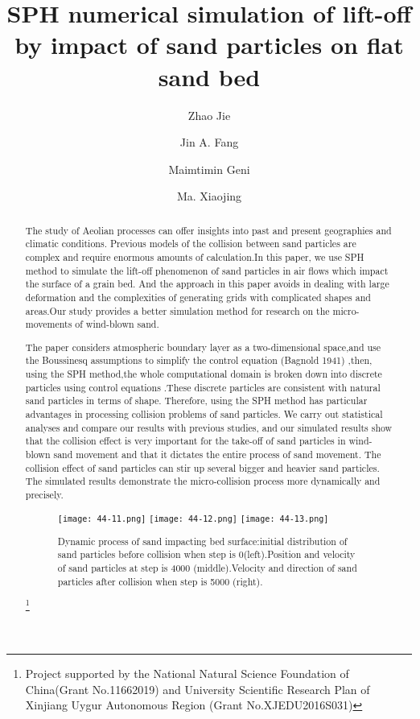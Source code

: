 \documentclass[10pt]{article}
\title{SPH numerical simulation of lift-off by impact of sand particles on flat sand bed}
\date{}
\author[$\relax$]{Zhao Jie}
\author[$\relax$]{Jin A. Fang}
\author[$\relax$]{Maimtimin Geni}
\author[$\relax$]{Ma. Xiaojing}
\affil[$\relax$]{College of Mechanical Engineering, Xinjiang University, Urumqi Xinjiang 830047 China}
\newcommand\blfootnote[1]{%
  \begingroup
  \renewcommand\thefootnote{}\footnote{#1}%
  \addtocounter{footnote}{-1}%
  \endgroup
}
\begin{document}
\maketitle


\begin{abstract}
The study of Aeolian processes can offer insights into past and present geographies and climatic conditions. Previous models of the collision between sand particles are complex and require enormous amounts of calculation.In this paper, we use SPH method to simulate the lift-off phenomenon of sand particles in air flows which impact the surface of a grain bed. And the approach in this paper avoids in dealing with large deformation and the complexities of generating grids with complicated shapes and areas.Our study provides a better simulation method for research on the micro-movements of wind-blown sand.

The paper considers atmospheric boundary layer as a two-dimensional space,and use the Boussinesq assumptions to simplify the control equation (Bagnold 1941) ,then, using the SPH method,the whole computational domain is broken down into discrete particles using control equations .These discrete particles are consistent with natural sand particles in terms of shape. Therefore, using the SPH method has particular advantages in processing collision problems of sand particles. We carry out statistical analyses and compare our results with previous studies, and our simulated results show that the collision effect is very important for the take-off of sand particles in wind-blown sand movement and that it dictates the entire process of sand movement. The collision effect of sand particles can stir up several bigger and heavier sand particles. The simulated results demonstrate the micro-collision process more dynamically and precisely.

\begin{figure}[!htb]
\centering
\texttt{[image: 44-11.png]}
\texttt{[image: 44-12.png]}
\texttt{[image: 44-13.png]}
\caption{Dynamic process of sand impacting bed surface:initial distribution of sand particles before collision when step is 0(left).Position and velocity of sand particles at step is 4000 (middle).Velocity and direction of sand particles after collision when step is 5000 (right).}\label{fig:44}
\end{figure}

\blfootnote{Project supported by the National Natural Science Foundation of China(Grant No.11662019) and University Scientific Research Plan of Xinjiang Uygur Autonomous Region (Grant No.XJEDU2016S031)}
\end{abstract}



\addbib
\end{document}
